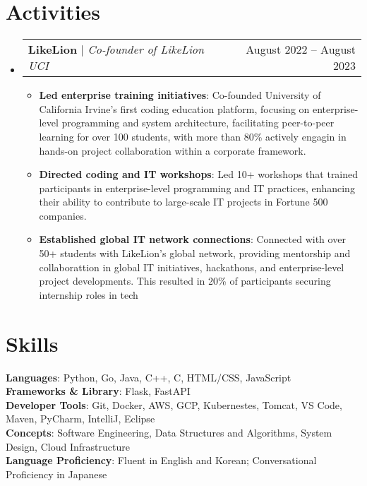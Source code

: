 \documentclass[letterpaper,11pt]{article}
\makeatletter
\newcommand{\resumeItem}[1]{
  \item\small{
    {#1 \vspace{-2pt}}
  }
}
\newcommand{\resumeActivitiesHeading}[2]{
    \item
    \begin{tabular*}{0.97\textwidth}{l@{\extracolsep{\fill}}r}
      \small#1 & #2 \\
    \end{tabular*}\vspace{-7pt}
}
\newcommand{\resumeSubHeadingListStart}{\begin{itemize}[leftmargin=0.15in, label={}]}
\newcommand{\resumeSubHeadingListEnd}{\end{itemize}}
\newcommand{\resumeItemListStart}{\begin{itemize}}
\newcommand{\resumeItemListEnd}{\end{itemize}\vspace{-5pt}}
\makeatother
\begin{document}
%

\section{Activities}
    \resumeSubHeadingListStart
      \resumeActivitiesHeading
          {\textbf{LikeLion} $|$ \emph{Co-founder of LikeLion UCI}}{August 2022 -- August 2023}
          \resumeItemListStart
            \resumeItem{\textbf{Led enterprise training initiatives}: Co-founded University of California Irvine’s first coding education platform, focusing on enterprise-level programming and system architecture, facilitating peer-to-peer learning for over 100 students, with more than 80\% actively engagin in hands-on project collaboration within a corporate framework.}
            \resumeItem{\textbf{Directed coding and IT workshops}: Led 10+ workshops that trained participants in enterprise-level programming and IT practices, enhancing their ability to contribute to large-scale IT projects in Fortune 500 companies.}
            \resumeItem{\textbf{Established global IT network connections}: Connected with over 50+ students with LikeLion's global network, providing mentorship and collaborattion in global IT initiatives, hackathons, and enterprise-level project developments. This resulted in 20\% of participants securing internship roles in tech}
          \resumeItemListEnd
    \resumeSubHeadingListEnd

%

\section{Skills}
 \begin{itemize}[leftmargin=0.15in, label={}]
    \small{\item{
     \textbf{Languages}{: Python, Go, Java, C++, C, HTML/CSS, JavaScript} \\
     \textbf{Frameworks \& Library}{: Flask, FastAPI} \\
     \textbf{Developer Tools}{: Git, Docker, AWS, GCP, Kubernestes, Tomcat, VS Code, Maven, PyCharm, IntelliJ, Eclipse} \\
     \textbf{Concepts}{: Software Engineering, Data Structures and Algorithms, System Design, Cloud Infrastructure}\\
     \textbf{Language Proficiency}{: Fluent in English and Korean; Conversational Proficiency in Japanese}

    }}
 \end{itemize}


\end{document}
